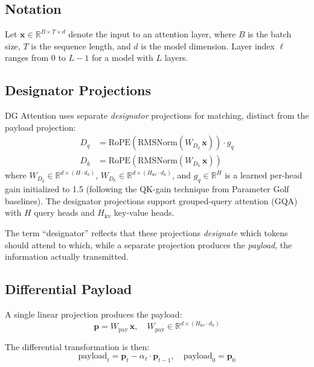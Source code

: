 \documentclass[11pt]{article}
\begin{document}
\subsection{Notation}
Let $\mathbf{x} \in \mathbb{R}^{B \times T \times d}$ denote the input to an attention layer, where $B$ is the batch size, $T$ is the sequence length, and $d$ is the model dimension. Layer index $\ell$ ranges from 0 to $L-1$ for a model with $L$ layers.

\subsection{Designator Projections}
DG Attention uses separate \emph{designator} projections for matching, distinct from the payload projection:
\begin{align}
    D_q &= \text{RoPE}\!\left(\text{RMSNorm}\!\left(W_{D_q}\, \mathbf{x}\right)\right) \cdot g_q \label{eq:dq} \\
    D_k &= \text{RoPE}\!\left(\text{RMSNorm}\!\left(W_{D_k}\, \mathbf{x}\right)\right) \label{eq:dk}
\end{align}
where $W_{D_q} \in \mathbb{R}^{d \times (H \cdot d_h)}$, $W_{D_k} \in \mathbb{R}^{d \times (H_{\text{kv}} \cdot d_h)}$, and $g_q \in \mathbb{R}^H$ is a learned per-head gain initialized to 1.5 (following the QK-gain technique from Parameter Golf baselines). The designator projections support grouped-query attention (GQA) with $H$ query heads and $H_{\text{kv}}$ key-value heads.

The term ``designator'' reflects that these projections \emph{designate} which tokens should attend to which, while a separate projection produces the \emph{payload}, the information actually transmitted.

\subsection{Differential Payload}
\label{sec:payload}
A single linear projection produces the payload:
\begin{equation}
    \mathbf{p} = W_{\text{pay}}\, \mathbf{x}, \quad W_{\text{pay}} \in \mathbb{R}^{d \times (H_{\text{kv}} \cdot d_h)}
    \label{eq:proj}
\end{equation}

The differential transformation is then:
\begin{equation}
    \text{payload}_t = \mathbf{p}_t - \alpha_\ell \cdot \mathbf{p}_{t-1}, \quad \text{payload}_0 = \mathbf{p}_0
    \label{eq:payload}
\end{equation}
\end{document}

